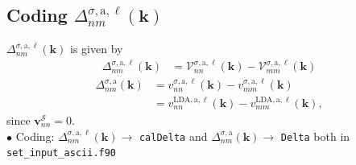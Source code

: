 
\subsection{Coding \texorpdfstring{$\Delta^{\sigma,\mathrm{a},\ell}_{nm}(\mathbf{k})$}{Deltanm}}

$\Delta^{\sigma,\mathrm{a},\ell}_{nm}(\mathbf{k})$  is given by
\begin{align}\label{caldelta}
\Delta^{\sigma,\mathrm{a},\ell}_{nm}(\mathbf{k})&=\mathcal{V}^{\sigma,\mathrm{a},\ell}_{nn}(\mathbf{k})-\mathcal{V}^{\sigma,\mathrm{a},\ell}_{mm}(\mathbf{k})
\end{align}
\begin{align}\label{delta}
\Delta^{\sigma,\mathrm{a}}_{nm}(\mathbf{k}) &=v^{\sigma,\mathrm{a},\ell}_{nn}(\mathbf{k})-v^{\sigma,\mathrm{a},\ell}_{mm}(\mathbf{k})
\nonumber\\
&=v^{\mathrm{LDA},\mathrm{a},\ell}_{nn}(\mathbf{k})-v^{\mathrm{LDA},\mathrm{a},\ell}_{mm}(\mathbf{k})
,
\end{align}
since $\mathbf{v}^\mathcal{S}_{nn}=0$.\\
$\bullet$ Coding: $\Delta^{\sigma,\mathrm{a},\ell}_{nm}(\mathbf{k})\to$ \verb=calDelta= 
and
$\Delta^{\sigma,\mathrm{a}}_{nm}(\mathbf{k})\to$ \verb=Delta= both in \verb=set_input_ascii.f90= 



